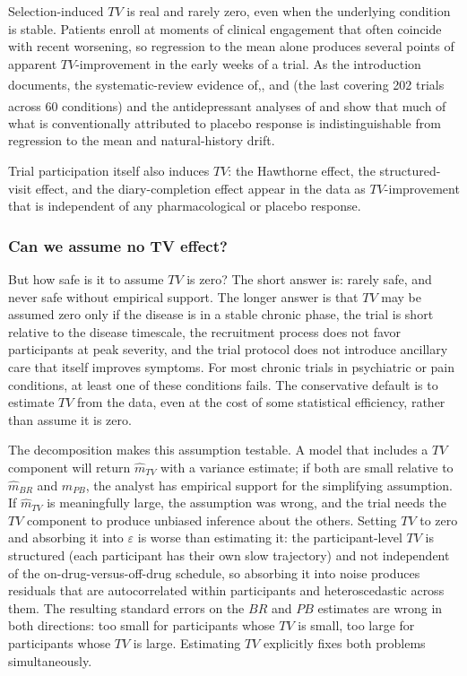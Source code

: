 \documentclass[
  11pt,
]{article}
\begin{document}
Selection-induced \(TV\) is real and rarely zero, even when the underlying
condition is stable. Patients enroll at moments of clinical engagement that
often coincide with recent worsening, so regression to the mean alone produces
several points of apparent \(TV\)-improvement in the early weeks of a trial. As
the introduction documents, the systematic-review evidence of\textsuperscript{},\textsuperscript{}, and\textsuperscript{} (the last covering
202 trials across 60 conditions) and the antidepressant analyses of\textsuperscript{} and\textsuperscript{} show that much of what is conventionally
attributed to placebo response is indistinguishable from regression to the
mean and natural-history drift.

Trial participation itself also induces \(TV\): the Hawthorne effect, the
structured-visit effect, and the diary-completion effect appear in the data as
\(TV\)-improvement that is independent of any pharmacological or placebo
response.

\subsubsection{Can we assume no TV effect?}\label{can-we-assume-no-tv-effect}

But how safe is it to assume \(TV\) is zero? The short answer is: rarely safe,
and never safe without empirical support. The longer answer is that \(TV\) may
be assumed zero only if the disease is in a stable chronic phase, the trial is
short relative to the disease timescale, the recruitment process does not
favor participants at peak severity, and the trial protocol does not introduce
ancillary care that itself improves symptoms. For most chronic trials in
psychiatric or pain conditions, at least one of these conditions fails. The
conservative default is to estimate \(TV\) from the data, even at the cost of
some statistical efficiency, rather than assume it is zero.

The decomposition makes this assumption testable. A model that includes a \(TV\)
component will return \(\hat{m}_{TV}\) with a variance estimate; if both are
small relative to \(\hat{m}_{BR}\) and \(\hat{m}_{PB}\), the analyst has empirical
support for the simplifying assumption. If \(\hat{m}_{TV}\) is meaningfully
large, the assumption was wrong, and the trial needs the \(TV\) component to
produce unbiased inference about the others. Setting \(TV\) to zero and
absorbing it into \(\varepsilon\) is worse than estimating it: the
participant-level \(TV\) is structured (each participant has their own slow
trajectory) and not independent of the on-drug-versus-off-drug schedule, so
absorbing it into noise produces residuals that are autocorrelated within
participants and heteroscedastic across them. The resulting standard errors on
the \(BR\) and \(PB\) estimates are wrong in both directions: too small for
participants whose \(TV\) is small, too large for participants whose \(TV\) is
large. Estimating \(TV\) explicitly fixes both problems simultaneously.
\end{document}
